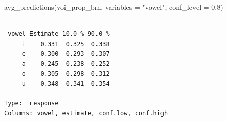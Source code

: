 \documentclass[
  authoryear,
  preprint,
  3p]{elsarticle}
\newenvironment{Shaded}{\begin{snugshade}}{\end{snugshade}}
\newcommand{\AttributeTok}[1]{\textcolor[rgb]{0.40,0.45,0.13}{#1}}
\newcommand{\FloatTok}[1]{\textcolor[rgb]{0.68,0.00,0.00}{#1}}
\newcommand{\FunctionTok}[1]{\textcolor[rgb]{0.28,0.35,0.67}{#1}}
\newcommand{\NormalTok}[1]{\textcolor[rgb]{0.00,0.23,0.31}{#1}}
\newcommand{\StringTok}[1]{\textcolor[rgb]{0.13,0.47,0.30}{#1}}
\begin{document}
\begin{Shaded}
\begin{Highlighting}[]
\FunctionTok{avg\_predictions}\NormalTok{(voi\_prop\_bm, }\AttributeTok{variables =} \StringTok{"vowel"}\NormalTok{, }\AttributeTok{conf\_level =} \FloatTok{0.8}\NormalTok{)}
\end{Highlighting}
\end{Shaded}

\begin{verbatim}

 vowel Estimate 10.0 % 90.0 %
     i    0.331  0.325  0.338
     e    0.300  0.293  0.307
     a    0.245  0.238  0.252
     o    0.305  0.298  0.312
     u    0.348  0.341  0.354

Type:  response 
Columns: vowel, estimate, conf.low, conf.high 
\end{verbatim}


\renewcommand\refname{Case study 2: pre-nasalisation in Greek}
  
\end{document}
